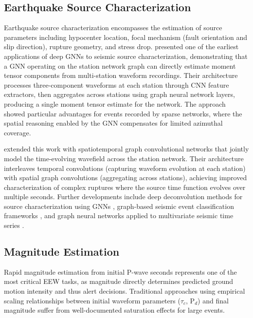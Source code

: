 \documentclass[review,authoryear]{elsarticle}
\begin{document}
\subsection{Earthquake Source Characterization}

Earthquake source characterization encompasses the estimation of source parameters including hypocenter location, focal mechanism (fault orientation and slip direction), rupture geometry, and stress drop. \citet{vandenende2020automated} presented one of the earliest applications of deep GNNs to seismic source characterization, demonstrating that a GNN operating on the station network graph can directly estimate moment tensor components from multi-station waveform recordings. Their architecture processes three-component waveforms at each station through CNN feature extractors, then aggregates across stations using graph neural network layers, producing a single moment tensor estimate for the network. The approach showed particular advantages for events recorded by sparse networks, where the spatial reasoning enabled by the GNN compensates for limited azimuthal coverage.

\citet{zhang2021spatiotemporal} extended this work with spatiotemporal graph convolutional networks that jointly model the time-evolving wavefield across the station network. Their architecture interleaves temporal convolutions (capturing waveform evolution at each station) with spatial graph convolutions (aggregating across stations), achieving improved characterization of complex ruptures where the source time function evolves over multiple seconds. Further developments include deep deconvolution methods for source characterization using GNNs \citep{vandenende2022deep}, graph-based seismic event classification frameworks \citep{zhang2022graph}, and graph neural networks applied to multivariate seismic time series \citep{bloemheuvel2022graph}.

\subsection{Magnitude Estimation}

Rapid magnitude estimation from initial P-wave seconds represents one of the most critical EEW tasks, as magnitude directly determines predicted ground motion intensity and thus alert decisions. Traditional approaches using empirical scaling relationships between initial waveform parameters ($\tau_c$, P$_d$) and final magnitude suffer from well-documented saturation effects for large events.
\end{document}
